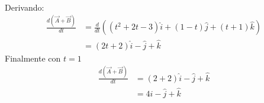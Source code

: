\documentclass[12pt,openany]{book}
\begin{document}
\begin{itemize}
\begin{equation*}
\begin{split}
							\end{split}
						\end{equation*}
						Derivando:
						\begin{equation*}
							\begin{split}
								\frac{d(\vec{A}+\vec{B})}{dt}&=\frac{d}{dt}\left((t^{2}+2t-3)\hat{i}+
																(1-t)\hat{j}+(t+1)\hat{k}\right)					\\
															 &=(2t+2)\hat{i}-\hat{j}+\hat{k}
							\end{split}
						\end{equation*}
						Finalmente con $t=1$
						\begin{equation*}
							\begin{split}
								\frac{d(\vec{A}+\vec{B})}{dt}&=(2+2)\hat{i}-\hat{j}+\hat{k}							\\
															 &=4\hat{i}-\hat{j}+\hat{k}
							\end{split}
						\end{equation*}


\end{itemize}
\end{document}
